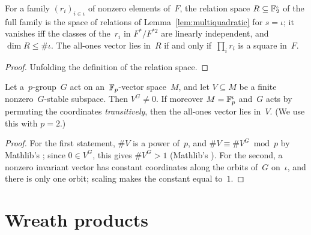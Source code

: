 \begin{lemma}
  \label{lem:relations}
  \leanok
  For a family $(r_i)_{i \in \iota}$ of nonzero elements of~$F$, the relation space
  $R \subseteq \mathbb{F}_2^{\iota}$ of the full family is the space of relations of
  Lemma~\ref{lem:multiquadratic} for $s = \iota$; it vanishes iff the classes of the~$r_i$ in
  $F^*/F^{*2}$ are linearly independent, and $\dim R \le \#\iota$. The all-ones vector lies
  in~$R$ if and only if~$\prod_i r_i$ is a square in~$F$.
\end{lemma}
\begin{proof}
  \leanok
  Unfolding the definition of the relation space.
\end{proof}

\begin{lemma}
  \label{lem:invariant}
  \leanok
  Let a~$p$-group~$G$ act on an~$\mathbb{F}_p$-vector space~$M$, and let $V \subseteq M$ be a finite
  nonzero~$G$-stable subspace. Then $V^G \ne 0$. If moreover $M = \mathbb{F}_p^{\iota}$ and~$G$ acts by
  permuting the coordinates \emph{transitively}, then the all-ones vector lies in~$V$.
  (We use this with $p = 2$.)
\end{lemma}
\begin{proof}
  \leanok
  For the first statement, $\#V$ is a power of~$p$, and $\#V \equiv \#V^G \bmod p$ by Mathlib's
  ; since $0 \in V^G$, this gives $\#V^G > 1$
  (Mathlib's ).
  For the second, a nonzero invariant vector has constant coordinates along the orbits of~$G$
  on~$\iota$, and there is only one orbit; scaling makes the constant equal to~$1$.
\end{proof}

\section{Wreath products}

